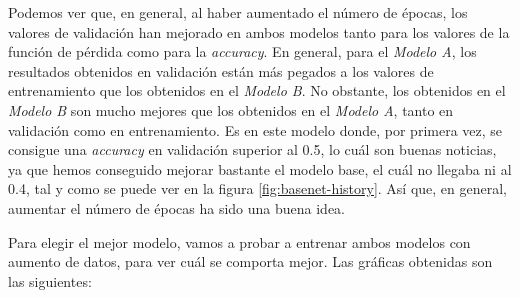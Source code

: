 \documentclass[11pt,a4paper]{article}
\begin{document}
Podemos ver que, en general, al haber aumentado el número de épocas, los valores de validación
han mejorado en ambos modelos tanto para los valores de la función de pérdida como para la
\textit{accuracy}. En general, para el \textit{Modelo A}, los resultados obtenidos en validación
están más pegados a los valores de entrenamiento que los obtenidos en el \textit{Modelo B}. No
obstante, los obtenidos en el \textit{Modelo B} son mucho mejores que los obtenidos en el
\textit{Modelo A}, tanto en validación como en entrenamiento. Es en este modelo donde, por primera
vez, se consigue una \textit{accuracy} en validación superior al 0.5, lo cuál son buenas noticias,
ya que hemos conseguido mejorar bastante el modelo base, el cuál no llegaba ni al 0.4, tal y como
se puede ver en la figura \ref{fig:basenet-history}. Así que, en general, aumentar el número de
épocas ha sido una buena idea.

Para elegir el mejor modelo, vamos a probar a entrenar ambos modelos con aumento de datos, para ver
cuál se comporta mejor. Las gráficas obtenidas son las siguientes:
\end{document}
